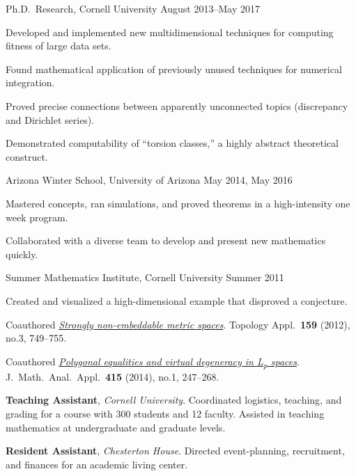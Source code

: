 \documentclass[11pt, letterpaper]{awesome-cv}
\begin{document}

\begin{cventries}

\cventry
	{Ph.D.~Research, Cornell University}
	{}{}
	{August 2013--May 2017}
	{
		\begin{cvitems}
			\item{Developed and implemented new multidimensional techniques for computing fitness of large data sets.}
			\item{Found mathematical application of previously unused techniques for numerical integration.}
			\item{Proved precise connections between apparently unconnected topics (discrepancy and Dirichlet series).}
			\item{Demonstrated computability of ``torsion classes,'' a highly abstract theoretical construct.}
		\end{cvitems}
	}
		
\cventry
	{Arizona Winter School, University of Arizona}
	{}{}
	{May 2014, May 2016}
	{
		\begin{cvitems}
			\item{Mastered concepts, ran simulations, and proved theorems in a high-intensity one week program.}
			\item{Collaborated with a diverse team to develop and present new mathematics quickly.}
		\end{cvitems}
	}
	
\cventry
	{Summer Mathematics Institute, Cornell University}
	{}{}
	{Summer 2011}
	{
		\begin{cvitems}
			\item{Created and visualized a high-dimensional example that disproved a conjecture.}
			\item{Coauthored \href{http://dx.doi.org/10.1016/j.topol.2011.11.041}{\emph{Strongly non-embeddable metric spaces}}. Topology Appl.~\textbf{159} (2012), no.3, 749--755.}
			\item{Coauthored \href{http://dx.doi.org/10.1016/j.jmaa.2014.01.063}{\emph{Polygonal equalities and virtual degeneracy in L\textsubscript{p} spaces}}. J.~Math.~Anal.~Appl.~\textbf{415} (2014), no.1, 247--268.}
		\end{cvitems}
	}
\end{cventries}






\begin{cvparagraph}
\textbf{Teaching Assistant}, \emph{Cornell University}. Coordinated logistics, teaching, and grading for a course with 300 students and 12 faculty.
Assisted in teaching mathematics at undergraduate and graduate levels.

\textbf{Resident Assistant}, \emph{Chesterton House}. Directed event-planning, recruitment, and finances for an academic living center. 
\end{cvparagraph}
\end{document}
